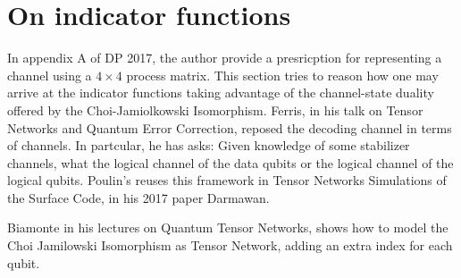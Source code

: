\documentclass[%
 reprint,
amsmath,amssymb,
aps,
onecolumn,
]{revtex4-2}
\begin{document}
\section{On indicator functions}
In appendix A of DP 2017, the author provide a presricption for representing a channel using a $4 \times 4$ process matrix. This section tries to reason how one may arrive at the indicator functions taking advantage of the channel-state duality offered by the Choi-Jamiolkowski Isomorphism. Ferris, in his talk on Tensor Networks and Quantum Error Correction, reposed the decoding channel in terms of channels. In partcular, he has asks: Given knowledge of some stabilizer channels, what the logical channel of the data qubits or the logical channel of the logical qubits. Poulin's reuses this framework in Tensor Networks Simulations of the Surface Code, in his 2017 paper Darmawan. 


Biamonte in his lectures on Quantum Tensor Networks, shows how to model the Choi Jamilowski Isomorphism as Tensor Network, adding an extra index for each qubit. 
\end{document}

